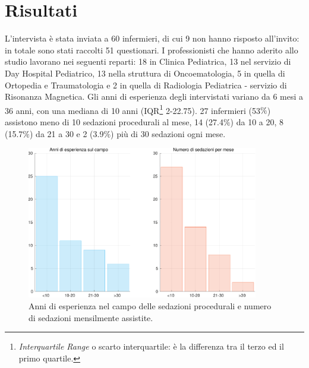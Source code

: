 \chapter{Risultati}

L'intervista è stata inviata a 60 infermieri, di cui 9 non hanno risposto all'invito: in totale sono stati raccolti 51 questionari. I professionisti che hanno aderito allo studio lavorano nei seguenti reparti: 18 in Clinica Pediatrica, 13 nel servizio di Day Hospital Pediatrico, 13 nella struttura di Oncoematologia, 5 in quella di Ortopedia e Traumatologia e 2 in quella di Radiologia Pediatrica - servizio di Risonanza Magnetica. Gli anni di esperienza degli intervistati variano da 6 mesi a 36 anni, con una mediana di 10 anni (IQR\footnote{\emph{Interquartile Range} o scarto interquartile: è la differenza tra il terzo ed il primo quartile.} 2-22.75). 27 infermieri (53$\%$) assistono meno di 10 sedazioni procedurali al mese, 14 (27.4$\%$) da 10 a 20, 8 (15.7$\%$) da 21 a 30 e 2 (3.9$\%$) più di 30 sedazioni ogni mese. 

\begin{figure}[h]
    \centering
    \includegraphics[width=0.9\textwidth]{Figure/esperienzaVSfrequenza.pdf}
    \caption{Anni di esperienza nel campo delle sedazioni procedurali e numero di sedazioni mensilmente assistite.}
    \label{fig:esperienzavsfrequenza}
\end{figure}

